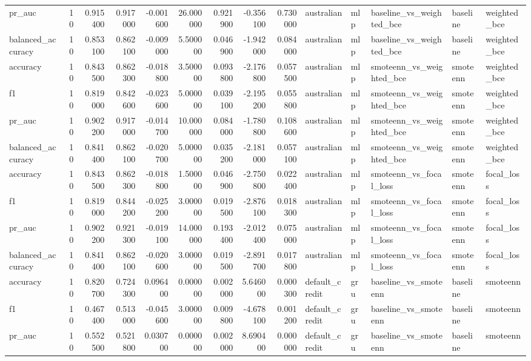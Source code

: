 \begin{tabular}{lrrrrrrrrlllll}
pr_auc & 10 & 0.915400 & 0.917000 & -0.001600 & 26.000000 & 0.921900 & -0.356100 & 0.730000 & australian & mlp & baseline_vs_weighted_bce & baseline & weighted_bce \\
balanced_accuracy & 10 & 0.853100 & 0.862100 & -0.009000 & 5.500000 & 0.046900 & -1.942000 & 0.084000 & australian & mlp & baseline_vs_weighted_bce & baseline & weighted_bce \\
accuracy & 10 & 0.843500 & 0.862300 & -0.018800 & 3.500000 & 0.093800 & -2.176800 & 0.057500 & australian & mlp & smoteenn_vs_weighted_bce & smoteenn & weighted_bce \\
f1 & 10 & 0.819000 & 0.842600 & -0.023600 & 5.000000 & 0.039100 & -2.195200 & 0.055800 & australian & mlp & smoteenn_vs_weighted_bce & smoteenn & weighted_bce \\
pr_auc & 10 & 0.902200 & 0.917000 & -0.014700 & 10.000000 & 0.084000 & -1.780800 & 0.108600 & australian & mlp & smoteenn_vs_weighted_bce & smoteenn & weighted_bce \\
balanced_accuracy & 10 & 0.841400 & 0.862100 & -0.020700 & 5.000000 & 0.035200 & -2.181000 & 0.057100 & australian & mlp & smoteenn_vs_weighted_bce & smoteenn & weighted_bce \\
accuracy & 10 & 0.843500 & 0.862300 & -0.018800 & 1.500000 & 0.046900 & -2.750800 & 0.022400 & australian & mlp & smoteenn_vs_focal_loss & smoteenn & focal_loss \\
f1 & 10 & 0.819000 & 0.844200 & -0.025200 & 3.000000 & 0.019500 & -2.876100 & 0.018300 & australian & mlp & smoteenn_vs_focal_loss & smoteenn & focal_loss \\
pr_auc & 10 & 0.902200 & 0.921300 & -0.019100 & 14.000000 & 0.193400 & -2.012400 & 0.075000 & australian & mlp & smoteenn_vs_focal_loss & smoteenn & focal_loss \\
balanced_accuracy & 10 & 0.841400 & 0.862100 & -0.020600 & 3.000000 & 0.019500 & -2.891700 & 0.017800 & australian & mlp & smoteenn_vs_focal_loss & smoteenn & focal_loss \\
accuracy & 10 & 0.820700 & 0.724300 & 0.096400 & 0.000000 & 0.002000 & 5.646000 & 0.000300 & default_credit & gru & baseline_vs_smoteenn & baseline & smoteenn \\
f1 & 10 & 0.467400 & 0.513000 & -0.045600 & 3.000000 & 0.009800 & -4.678100 & 0.001200 & default_credit & gru & baseline_vs_smoteenn & baseline & smoteenn \\
pr_auc & 10 & 0.552500 & 0.521800 & 0.030700 & 0.000000 & 0.002000 & 8.690400 & 0.000000 & default_credit & gru & baseline_vs_smoteenn & baseline & smoteenn \\

\end{tabular}
